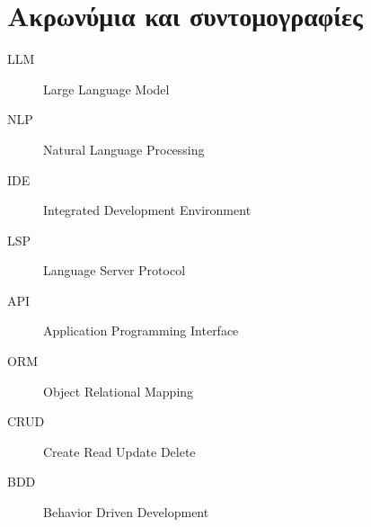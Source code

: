 \chapter{Ακρωνύμια και συντομογραφίες}

\begin{description}
\item[LLM]
  Large Language Model
\item[NLP]
  Natural Language Processing
\item[IDE]
  Integrated Development Environment
\item[LSP]
  Language Server Protocol
\item[API]
  Application Programming Interface
\item[ORM]
  Object Relational Mapping
\item[CRUD]
  Create Read Update Delete
\item[BDD]
  Behavior Driven Development
\end{description}
